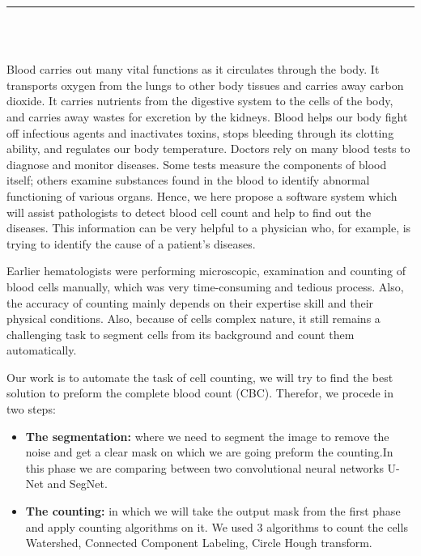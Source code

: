 \pagestyle{myfancy}

\vspace*{-0.2in}

\setcounter{page}{1}

\begin{center}
    {\color{Black} \rule{6.2in}{1.4mm} }\\
    \vspace{0.1in}
    \scshape{\fontsize{34}{46}{\bfseries{\color{Black}{Introduction}}
    }}
    \\
    
    \vspace{0.5in}
\end{center}
\hspace*{0.16in}

Blood carries out many vital functions as it circulates through the body. It transports oxygen from the lungs to other body tissues and carries away carbon dioxide. It carries nutrients from the digestive system to the cells of the body, and carries away wastes for excretion by the kidneys. Blood helps our body fight off infectious agents and inactivates toxins, stops bleeding through its clotting ability, and regulates our body temperature. Doctors rely on many blood tests to diagnose and monitor diseases. Some tests measure the components of blood itself; others examine substances found in the blood to identify abnormal functioning of various organs. Hence, we here propose a software system which will assist pathologists to detect blood cell count and help to find out the diseases. This information can be very helpful to a physician who, for example, is trying to identify the cause of a patient's diseases.

Earlier hematologists were performing microscopic, examination and counting of blood cells manually, which was very time-consuming and tedious process. Also, the accuracy of counting mainly depends on their expertise skill and their physical conditions. Also, because of cells complex nature, it still remains a challenging task to segment cells from its background and count them automatically.

Our work is to automate the task of cell counting, we will try to find the best solution to preform the complete blood count (CBC). Therefor, we procede in two steps:
\begin{itemize}
    \item \textbf{The segmentation:} where we need to segment the image to remove the noise and get a clear mask on which we are going preform the counting.In this phase we are comparing between two convolutional neural networks U-Net and SegNet.
    \item \textbf{The counting:} in which we will take the output mask from the first phase and apply counting algorithms on it. We used 3 algorithms to count the cells Watershed, Connected Component Labeling, Circle Hough transform.\
\end{itemize}

